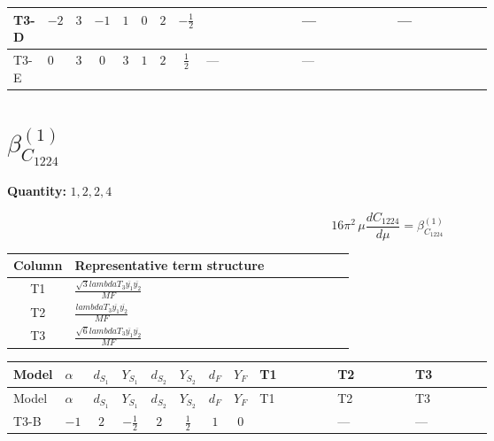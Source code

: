 \documentclass[8pt]{article}
\begin{document}
\begin{landscape}
\begin{longtable}{@{}llcccccc >{\raggedright\arraybackslash}p{0.21\linewidth} >{\raggedright\arraybackslash}p{0.21\linewidth} >{\raggedright\arraybackslash}p{0.21\linewidth}@{}}
\midrule
T3-D & $-2$ & $3$ & $-1$ & $1$ & $0$ & $2$ & $-\frac{1}{2}$ & \scriptsize\adjustbox{max width=\linewidth}{$\begin{gathered} - \frac{\sqrt{3} i lambdaT_{3} \overline{y_{1}} \overline{y_{2}}}{3 MF}\end{gathered}$} & --- & --- \\
\midrule
T3-E & $0$ & $3$ & $0$ & $3$ & $1$ & $2$ & $\frac{1}{2}$ & --- & --- & \scriptsize\adjustbox{max width=\linewidth}{$\begin{gathered} \frac{\sqrt{6} i lambdaT_{3} \overline{y_{1}} \overline{y_{2}}}{3 MF}\end{gathered}$} \\
\midrule
\bottomrule
\end{longtable}
\clearpage
\section*{$\beta_{C_{1224}}^{(1)}$}
\noindent\textbf{Quantity: }$\mathrm{1,2,2,4}$\par\smallskip
\[16\pi^2\,\mu\frac{d C_{1224}}{d\mu}=\beta_{C_{1224}}^{(1)}\]
\begin{center}
\begin{tabular}{@{}c >{\raggedright\arraybackslash}p{0.82\linewidth}@{}}
\toprule
Column & Representative term structure \\
\midrule
T1 & \(\displaystyle \frac{\sqrt{3} lambdaT_{3} \overline{y_{1}} \overline{y_{2}}}{MF}\) \\
\midrule
T2 & \(\displaystyle \frac{lambdaT_{3} \overline{y_{1}} \overline{y_{2}}}{MF}\) \\
\midrule
T3 & \(\displaystyle \frac{\sqrt{6} lambdaT_{3} \overline{y_{1}} \overline{y_{2}}}{MF}\) \\
\midrule
\bottomrule
\end{tabular}
\end{center}
\smallskip
\tiny
\begin{longtable}{@{}llcccccc >{\raggedright\arraybackslash}p{0.21\linewidth} >{\raggedright\arraybackslash}p{0.21\linewidth} >{\raggedright\arraybackslash}p{0.21\linewidth}@{}}
\toprule
Model & $\alpha$ & $d_{S_1}$ & $Y_{S_1}$ & $d_{S_2}$ & $Y_{S_2}$ & $d_F$ & $Y_F$ & T1 & T2 & T3 \\
\midrule
\endfirsthead
\toprule
Model & $\alpha$ & $d_{S_1}$ & $Y_{S_1}$ & $d_{S_2}$ & $Y_{S_2}$ & $d_F$ & $Y_F$ & T1 & T2 & T3 \\
\midrule
\endhead
T3-B & $-1$ & $2$ & $-\frac{1}{2}$ & $2$ & $\frac{1}{2}$ & $1$ & $0$ & \scriptsize\adjustbox{max width=\linewidth}{$\begin{gathered} \frac{\sqrt{3} lambdaT_{3} \overline{y_{1}} \overline{y_{2}}}{3 MF}\end{gathered}$} & --- & --- \\

\end{longtable}
\end{landscape}
\end{document}
